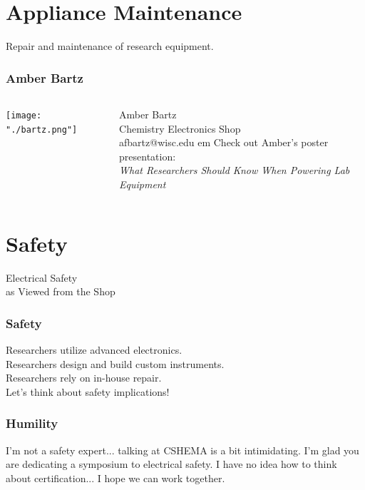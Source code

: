 \documentclass{presentation}
\begin{document}
\section{Appliance Maintenance}

\begin{frame}
  \huge
  Repair and maintenance of research equipment.
\end{frame}

\begin{frame}\frametitle{Amber Bartz}
  \begin{columns}
    \begin{column}{0.33\textwidth}
      \texttt{[image: "./bartz.png"]}
    \end{column}
    \begin{column}{0.67\textwidth}
      Amber Bartz \\
      Chemistry Electronics Shop \\
      afbartz@wisc.edu
       em
      Check out Amber's poster presentation: \\
      \emph{What Researchers Should Know When Powering Lab Equipment}
    \end{column}
  \end{columns}
\end{frame}

\section{Safety}

\begin{frame}
  Electrical Safety \\
  as Viewed from the Shop
\end{frame}

\begin{frame}\frametitle{Safety}
  Researchers utilize advanced electronics. \\
  Researchers design and build custom instruments. \\
  Researchers rely on in-house repair. \\
  \vfill{}
  Let's think about safety implications!
\end{frame}

\begin{frame}\frametitle{Humility}
  I'm not a safety expert... talking at CSHEMA is a bit intimidating.
  \vfill
  I'm glad you are dedicating a symposium to electrical safety.
  \vfill
  I have no idea how to think about certification...
  \vfill
  I hope we can work together.
\end{frame}
\end{document}
